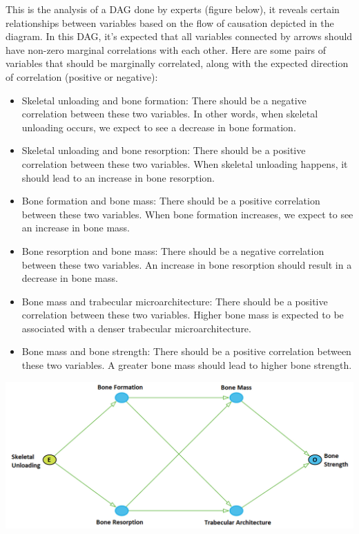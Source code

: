 \documentclass{article}
\begin{document}
This is the analysis of a DAG done by experts (figure below), it reveals certain relationships between variables based on the flow of causation depicted in the diagram. In this DAG, it's expected that all variables connected by arrows should have non-zero marginal correlations with each other. Here are some pairs of variables that should be marginally correlated, along with the expected direction of correlation (positive or negative):
\begin{itemize}
  \item Skeletal unloading and bone formation: There should be a negative correlation between these two variables. In other words, when skeletal unloading occurs, we expect to see a decrease in bone formation.
  \item Skeletal unloading and bone resorption: There should be a positive correlation between these two variables. When skeletal unloading happens, it should lead to an increase in bone resorption.
  \item Bone formation and bone mass: There should be a positive correlation between these two variables. When bone formation increases, we expect to see an increase in bone mass.
  \item Bone resorption and bone mass: There should be a negative correlation between these two variables. An increase in bone resorption should result in a decrease in bone mass.
  \item Bone mass and trabecular microarchitecture: There should be a positive correlation between these two variables. Higher bone mass is expected to be associated with a denser trabecular microarchitecture.
  \item Bone mass and bone strength: There should be a positive correlation between these two variables. A greater bone mass should lead to higher bone strength.
\end{itemize}


\includegraphics[width=\textwidth,height=\textheight,keepaspectratio]{dagpub.png}
\end{document}
